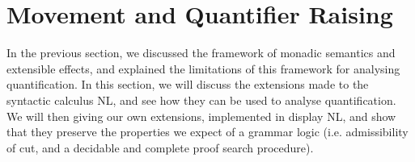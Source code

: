 \documentclass[a4paper]{article}
\begin{document}







\section{Movement and Quantifier Raising}%
\label{sec:movement-and-quantifier-raising}

In the previous section, we discussed the framework of monadic
semantics and extensible effects, and explained the limitations of
this framework for analysing quantification. In this section, we will
discuss the extensions made to the syntactic calculus NL, and see how
they can be used to analyse quantification. We will then giving our
own extensions, implemented in display NL, and show that they preserve
the properties we expect of a grammar logic (i.e. admissibility of
cut, and a decidable and complete proof search procedure).
\end{document}
